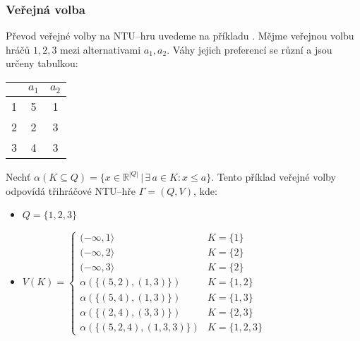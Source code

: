         \subsubsection*{Veřejná volba}
            Převod veřejné volby na NTU--hru uvedeme na příkladu \cite[str. 120]{Game_Theory}. Mějme veřejnou volbu hráčů $1, 2, 3$ mezi alternativami $a_1, a_2$. Váhy jejich preferencí se různí a jsou určeny tabulkou:

            \begin{table}[!h]
                \centering
                \begin{tabular}{|c||c|c|}
                    \hline
                    & $a_1$ & $a_2$\\
                    \hline\hline
                    1 & 5 & 1 \\
                    \hline
                    2 & 2 & 3 \\
                    \hline
                    3 & 4 & 3 \\
                    \hline
                \end{tabular}
            \end{table}

            Nechť $\alpha(K \subseteq Q) = \{x \in \mathbb{R}^{|Q|}\,|\, \exists\, a \in K:  x \leqslant a\}$. Tento příklad veřejné volby odpovídá třihráčové NTU--hře $\Gamma = (Q, V)$, kde:
            \begin{itemize}
                \vspace*{-0.3em}
                \item $Q = \{1,2,3\}$
                \item $V(K) = \begin{cases}
                    (-\infty, 1\rangle & K = \{1\}\\
                    (-\infty, 2\rangle & K = \{2\}\\
                    (-\infty, 3\rangle & K = \{2\}\\
                    \alpha(\{(5, 2), (1, 3)\}) & K = \{1,2\}\\
                    \alpha(\{(5, 4), (1, 3)\}) & K = \{1,3\}\\
                    \alpha(\{(2, 4), (3, 3)\}) & K = \{2, 3\}\\
                    \alpha(\{(5, 2, 4), (1, 3, 3)\}) & K = \{1,2,3\}
                \end{cases}$
            \end{itemize}

